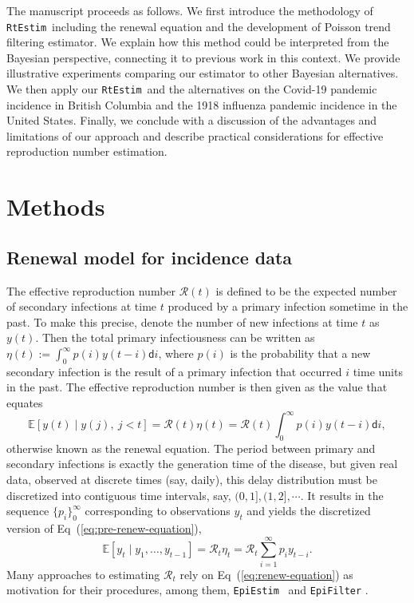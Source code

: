 \documentclass[10pt,letterpaper]{article}
\def\RtEstim{\texttt{RtEstim}}
\def\EpiEstim{\texttt{EpiEstim}}
\def\bbE{\mathbb{E}}
\def\calR{\mathcal{R}}
\def\diff{\mathsf{d}}
\newcommand{\citep}[1]{\cite{#1}}
\renewcommand{\eqref}[1]{Eq~(\ref{#1})}
\begin{document}
The manuscript proceeds as follows. We first introduce the methodology of
\RtEstim\ including the renewal equation and the development of Poisson
trend filtering estimator. We explain how this method could be interpreted from
the Bayesian perspective, connecting it to previous work in this context. We
provide illustrative experiments comparing our estimator to other Bayesian alternatives. 
We then apply our \RtEstim\ and the alternatives on the Covid-19 pandemic incidence in
British Columbia and the 1918 influenza pandemic incidence in the United States. 
Finally, we conclude with a discussion of the advantages and limitations of our 
approach and describe practical considerations for effective reproduction number
estimation.


\section{Methods}

\subsection{Renewal model for incidence data} 

The effective reproduction number $\calR(t)$ is defined to be the expected
number of secondary infections at time $t$ produced by a primary infection
sometime in the past. To make this precise, denote the number of new infections
at time $t$ as $y(t)$. Then the total primary infectiousness can be written as
$\eta(t) := \int_0^{\infty} p(i) y(t-i) \diff i$, where $p(i)$ is the
probability that a new secondary infection is the result of a primary infection
that occurred $i$ time units in the past. The effective reproduction number is then given
as the value that equates
\begin{equation} \label{eq:pre-renew-equation}
  \bbE[y(t) \mid y(j),\ j<t]=\calR(t)\eta(t)=\calR(t)\int_0^\infty p(i)y(t-i)\diff i,
\end{equation}
otherwise known as the renewal equation. The period between primary and secondary
infections is exactly the generation time of the disease, but given real data,
observed at discrete times (say, daily), this delay distribution must be discretized
into contiguous time intervals,
say, $(0,1], (1,2], \cdots$. It results in the sequence $\{p_i\}_0^\infty$
corresponding to observations $y_t$ and yields the
discretized version of \eqref{eq:pre-renew-equation},
\begin{equation} \label{eq:renew-equation}
  \bbE[y_t \mid y_1,\ldots,y_{t-1}]=\calR_t\eta_t=\calR_t\sum_{i = 1}^\infty p_i y_{t-i}.
\end{equation}
Many approaches to estimating $\calR_t$ rely on \eqref{eq:renew-equation} as
motivation for their procedures, among them, \EpiEstim\ \citep{cori2013new} 
and \texttt{EpiFilter} \citep{parag2021improved}. 
\end{document}

